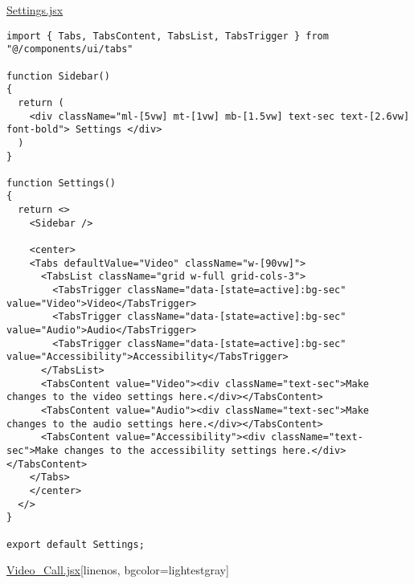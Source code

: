 \underline{Settings.jsx}

\begin{verbatim}
import { Tabs, TabsContent, TabsList, TabsTrigger } from "@/components/ui/tabs"

function Sidebar()
{
  return (
    <div className="ml-[5vw] mt-[1vw] mb-[1.5vw] text-sec text-[2.6vw] font-bold"> Settings </div>
  )
}

function Settings()
{
  return <>
    <Sidebar />

    <center>
    <Tabs defaultValue="Video" className="w-[90vw]">
      <TabsList className="grid w-full grid-cols-3">
        <TabsTrigger className="data-[state=active]:bg-sec" value="Video">Video</TabsTrigger>
        <TabsTrigger className="data-[state=active]:bg-sec" value="Audio">Audio</TabsTrigger>
        <TabsTrigger className="data-[state=active]:bg-sec" value="Accessibility">Accessibility</TabsTrigger>
      </TabsList>
      <TabsContent value="Video"><div className="text-sec">Make changes to the video settings here.</div></TabsContent>
      <TabsContent value="Audio"><div className="text-sec">Make changes to the audio settings here.</div></TabsContent>
      <TabsContent value="Accessibility"><div className="text-sec">Make changes to the accessibility settings here.</div></TabsContent>
    </Tabs>
    </center>
  </>
}

export default Settings;
\end{verbatim}

\underline{Video\_Call.jsx}[linenos, bgcolor=lightestgray]

